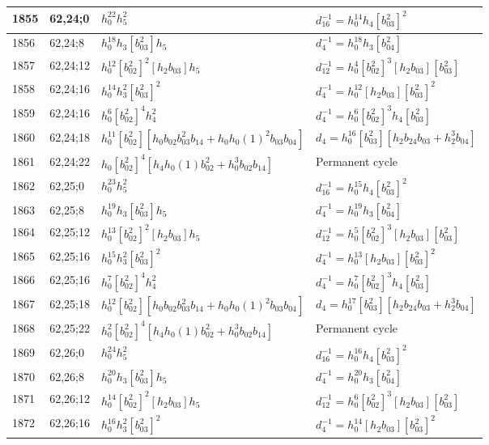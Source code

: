\documentclass{article}
\begin{document}
\begin{longtable}{|l|l|>{\raggedright\arraybackslash}p{6cm}|>{\raggedright\arraybackslash}p{6cm}|}
\hline
1855 & 62,24;0 & $h_0^{22}h_5^2$ & $d_{16}^{-1}=h_0^{14}h_4[b_{03}^2]^2$\\
\hline
1856 & 62,24;8 & $h_0^{18}h_3[b_{03}^2]h_5$ & $d_{4}^{-1}=h_0^{18}h_3[b_{04}^2]$\\
\hline
1857 & 62,24;12 & $h_0^{12}[b_{02}^2]^2[h_2b_{03}]h_5$ & $d_{12}^{-1}=h_0^4[b_{02}^2]^3[h_2b_{03}][b_{03}^2]$\\
\hline
1858 & 62,24;16 & $h_0^{14}h_3^2[b_{03}^2]^2$ & $d_{4}^{-1}=h_0^{12}[h_2b_{03}][b_{03}^2]^2$\\
1859 & 62,24;16 & $h_0^6[b_{02}^2]^4h_4^2$ & $d_{4}^{-1}=h_0^6[b_{02}^2]^3h_4[b_{03}^2]$\\
\hline
1860 & 62,24;18 & $h_0^{11}[b_{02}^2][h_0b_{02}b_{03}^2b_{14} + h_0h_0(1)^2b_{03}b_{04}]$ &$d_{4}=h_0^{16}[b_{03}^2][h_2b_{24}b_{03} + h_2^3b_{04}]$\\
\hline
1861 & 62,24;22 & $h_0[b_{02}^2]^4[h_4h_0(1)b_{02}^2 + h_0^3b_{02}b_{14}]$ & Permanent cycle\\
\hline
1862 & 62,25;0 & $h_0^{23}h_5^2$ & $d_{16}^{-1}=h_0^{15}h_4[b_{03}^2]^2$\\
\hline
1863 & 62,25;8 & $h_0^{19}h_3[b_{03}^2]h_5$ & $d_{4}^{-1}=h_0^{19}h_3[b_{04}^2]$\\
\hline
1864 & 62,25;12 & $h_0^{13}[b_{02}^2]^2[h_2b_{03}]h_5$ & $d_{12}^{-1}=h_0^5[b_{02}^2]^3[h_2b_{03}][b_{03}^2]$\\
\hline
1865 & 62,25;16 & $h_0^{15}h_3^2[b_{03}^2]^2$ & $d_{4}^{-1}=h_0^{13}[h_2b_{03}][b_{03}^2]^2$\\
1866 & 62,25;16 & $h_0^7[b_{02}^2]^4h_4^2$ & $d_{4}^{-1}=h_0^7[b_{02}^2]^3h_4[b_{03}^2]$\\
\hline
1867 & 62,25;18 & $h_0^{12}[b_{02}^2][h_0b_{02}b_{03}^2b_{14} + h_0h_0(1)^2b_{03}b_{04}]$ &$d_{4}=h_0^{17}[b_{03}^2][h_2b_{24}b_{03} + h_2^3b_{04}]$\\
\hline
1868 & 62,25;22 & $h_0^2[b_{02}^2]^4[h_4h_0(1)b_{02}^2 + h_0^3b_{02}b_{14}]$ & Permanent cycle\\
\hline
1869 & 62,26;0 & $h_0^{24}h_5^2$ & $d_{16}^{-1}=h_0^{16}h_4[b_{03}^2]^2$\\
\hline
1870 & 62,26;8 & $h_0^{20}h_3[b_{03}^2]h_5$ & $d_{4}^{-1}=h_0^{20}h_3[b_{04}^2]$\\
\hline
1871 & 62,26;12 & $h_0^{14}[b_{02}^2]^2[h_2b_{03}]h_5$ & $d_{12}^{-1}=h_0^6[b_{02}^2]^3[h_2b_{03}][b_{03}^2]$\\
\hline
1872 & 62,26;16 & $h_0^{16}h_3^2[b_{03}^2]^2$ & $d_{4}^{-1}=h_0^{14}[h_2b_{03}][b_{03}^2]^2$\\

\end{longtable}
\end{document}
